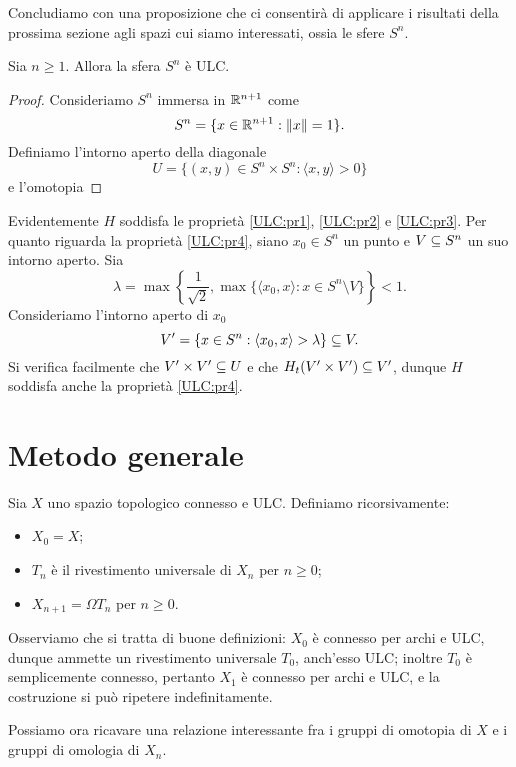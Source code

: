 Concludiamo con una proposizione che ci consentirà di applicare i risultati della prossima sezione agli spazi cui siamo interessati, ossia le sfere $S^n$.

\begin{proposition}
Sia $n\ge 1$. Allora la sfera $S^n$ è ULC.
\end{proposition}
\begin{proof}
Consideriamo $S^n$ immersa in $\mathbb{R}^{n+1}$ come
$$
S^n=\{x\in\mathbb{R}^{n+1}:\left\lVert x\right\rVert=1\}.
$$
Definiamo l'intorno aperto della diagonale
$$
U=\{(x,y)\in S^n\times S^n:\langle x,y\rangle>0\}
$$
e l'omotopia
\end{proof}
Evidentemente $H$ soddisfa le proprietà \ref{ULC:pr1}, \ref{ULC:pr2} e \ref{ULC:pr3}. Per quanto riguarda la proprietà \ref{ULC:pr4}, siano $x_0\in S^n$ un punto e $V\subseteq S^n$ un suo intorno aperto. Sia
$$
\lambda=\max\left\{\frac{1}{\sqrt{2}},\max\{\langle x_0,x\rangle:x\in S^n\setminus V\}\right\}<1.
$$
Consideriamo l'intorno aperto di $x_0$
$$
V'=\{x\in S^n:\langle x_0,x\rangle>\lambda\}\subseteq V.
$$
Si verifica facilmente che $V'\times V'\subseteq U$ e che $H_t(V'\times V')\subseteq V'$, dunque $H$ soddisfa anche la proprietà \ref{ULC:pr4}.

\section{Metodo generale}

Sia $X$ uno spazio topologico connesso e ULC. Definiamo ricorsivamente:
\begin{itemize}
\item $X_0=X$;
\item $T_n$ è il rivestimento universale di $X_n$ per $n\ge 0$;
\item $X_{n+1}=\Omega T_n$ per $n\ge 0$.
\end{itemize}
Osserviamo che si tratta di buone definizioni: $X_0$ è connesso per archi e ULC, dunque ammette un rivestimento universale $T_0$, anch'esso ULC; inoltre $T_0$ è semplicemente connesso, pertanto $X_1$ è connesso per archi e ULC, e la costruzione si può ripetere indefinitamente.

Possiamo ora ricavare una relazione interessante fra i gruppi di omotopia di $X$ e i gruppi di omologia di $X_n$.

